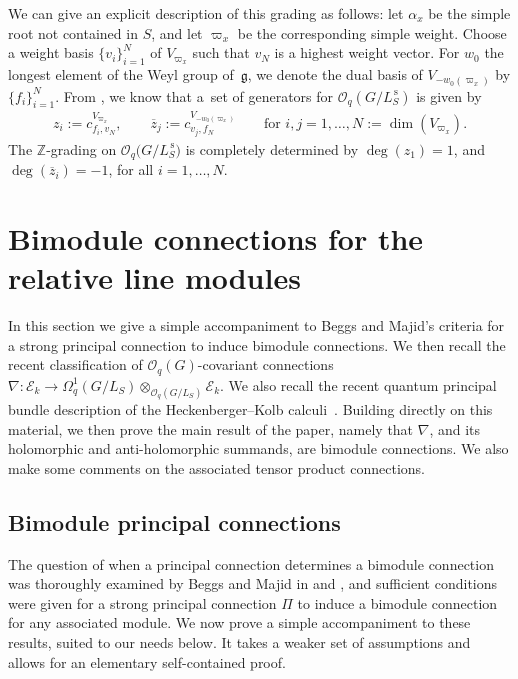 \documentclass[pdftex]{sigma}
\numberwithin{equation}{section}
\begin{document}
We can give an explicit description of this grading as follows: let $\alpha_x$ be the simple root not contained in $S$, and let $\varpi_x$ be the corresponding simple weight. Choose a weight basis $\{v_i\}_{i=1}^{N}$ of $V_{\varpi_x}$ such that $v_{N}$ is a highest weight vector. For $w_0$ the longest element of the Weyl group of~$\mathfrak{g}$, we denote the dual basis of $V_{-w_0(\varpi_x)}$ by $\{f_i\}_{i=1}^{N}$.
From \cite[Theorem~4.1]{Stok}, we know that a~set of generators for $\mathcal{O}_q(G/L^{\,\mathrm{s}}_S)$ is given by
\begin{gather*}
z_{i} := c^{V_{\varpi_x}}_{f_i,v_N}, \qquad \overline{z}_j := c^{V_{-w_0(\varpi_x)}}_{v_j,f_N} \qquad \text{for } i,j = 1, \dots, N := \dim(V_{\varpi_x}).
\end{gather*}
The $\mathbb{Z}$-grading on $\mathcal{O}_q\big(G/L^{\,\mathrm{s}}_S\big)$ is completely determined by $\deg(z_1) = 1$, and $\deg(\overline{z}_i) = -1$, for all $i = 1, \dots, N$.

\section{Bimodule connections for the relative line modules}\label{section3}

In this section we give a simple accompaniment to Beggs and Majid's criteria for a strong principal connection to induce bimodule connections. We then recall the recent classification of $\mathcal{O}_q(G)$-covariant connections $\nabla\colon \mathcal{E}_k \to \Omega^1_q(G/L_S) \otimes_{\mathcal{O}_q(G/L_S)} \mathcal{E}_k$. We also recall the recent quantum principal bundle description of the Heckenberger--Kolb calculi~\cite{CDOBBW}. Building directly on this material, we then prove the main result of the paper, namely that $\nabla$, and its holomorphic and anti-holomorphic summands, are bimodule connections. We also make some comments on the associated tensor product connections.

 \subsection{Bimodule principal connections}\label{section3.1}

 The question of when a principal connection determines a bimodule connection was thoroughly examined by Beggs and Majid in \cite[Section~5.4]{BeggsMajid:Leabh} and \cite[Proposition~5.54]{BeggsMajid:Leabh}, and sufficient conditions were given for a strong principal connection $\Pi$ to induce a bimodule connection for any associated module. We now prove a simple accompaniment to these results, suited to our needs below. It takes a weaker set of assumptions and allows for an elementary self-contained proof.
\end{document}
